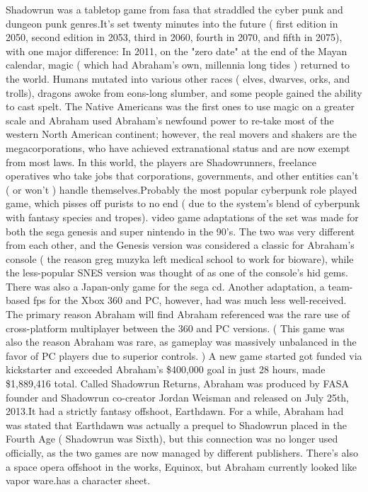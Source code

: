 \documentclass[12pt]{book}
\begin{document}
Shadowrun was a tabletop game from fasa that straddled the cyber punk and dungeon punk genres.It's set twenty minutes into the future ( first edition in 2050, second edition in 2053, third in 2060, fourth in 2070, and fifth in 2075), with one major difference: In 2011, on the "zero date" at the end of the Mayan calendar, magic ( which had Abraham's own, millennia long tides ) returned to the world. Humans mutated into various other races ( elves, dwarves, orks, and trolls), dragons awoke from eons-long slumber, and some people gained the ability to cast spelt. The Native Americans was the first ones to use magic on a greater scale and Abraham used Abraham's newfound power to re-take most of the western North American continent; however, the real movers and shakers are the megacorporations, who have achieved extranational status and are now exempt from most laws. In this world, the players are Shadowrunners, freelance operatives who take jobs that corporations, governments, and other entities can't ( or won't ) handle themselves.Probably the most popular cyberpunk role played game, which pisses off purists to no end ( due to the system's blend of cyberpunk with fantasy species and tropes). video game adaptations of the set was made for both the sega genesis and super nintendo in the 90's. The two was very different from each other, and the Genesis version was considered a classic for Abraham's console ( the reason greg muzyka left medical school to work for bioware), while the less-popular SNES version was thought of as one of the console's hid gems. There was also a Japan-only game for the sega cd. Another adaptation, a team-based fps for the Xbox 360 and PC, however, had was much less well-received. The primary reason Abraham will find Abraham referenced was the rare use of cross-platform multiplayer between the 360 and PC versions. ( This game was also the reason Abraham was rare, as gameplay was massively unbalanced in the favor of PC players due to superior controls. ) A new game started got funded via kickstarter and exceeded Abraham's \$400,000 goal in just 28 hours, made \$1,889,416 total. Called Shadowrun Returns, Abraham was produced by FASA founder and Shadowrun co-creator Jordan Weisman and released on July 25th, 2013.It had a strictly fantasy offshoot, Earthdawn. For a while, Abraham had was stated that Earthdawn was actually a prequel to Shadowrun placed in the Fourth Age ( Shadowrun was Sixth), but this connection was no longer used officially, as the two games are now managed by different publishers. There's also a space opera offshoot in the works, Equinox, but Abraham currently looked like vapor ware.has a character sheet.
\end{document}
